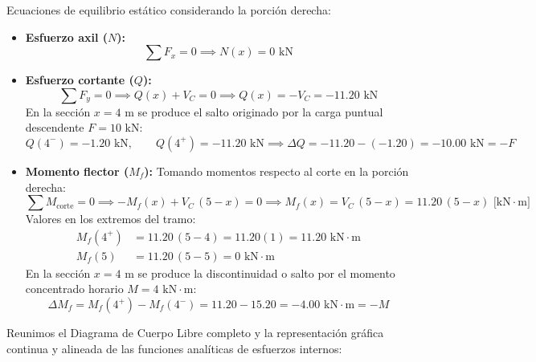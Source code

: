 Ecuaciones de equilibrio estático considerando la porción derecha:
\begin{itemize}
    \item \textbf{Esfuerzo axil ($N$):}
          \begin{equation}
              \sum F_x = 0 \implies \boxed{N(x) = 0\text{ kN}}
          \end{equation}

    \item \textbf{Esfuerzo cortante ($Q$):}
          \begin{equation}
              \sum F_y = 0 \implies Q(x) + V_C = 0 \implies \boxed{Q(x) = -V_C = -11.20\text{ kN}}
          \end{equation}
          En la sección $x = 4\text{ m}$ se produce el salto originado por la carga puntual descendente $F = 10\text{ kN}$:
          \begin{equation*}
              Q(4^-) = -1.20\text{ kN}, \qquad Q(4^+) = -11.20\text{ kN} \implies \Delta Q = -11.20 - (-1.20) = -10.00\text{ kN} = -F
          \end{equation*}

    \item \textbf{Momento flector ($M_f$):}
          Tomando momentos respecto al corte en la porción derecha:
          \begin{equation}
              \sum M_{\text{corte}} = 0 \implies -M_f(x) + V_C\,(5 - x) = 0 \implies \boxed{M_f(x) = V_C\,(5 - x) = 11.20\,(5 - x)\text{ [kN}\cdot\text{m]}}
          \end{equation}
          Valores en los extremos del tramo:
          \begin{align*}
              M_f(4^+) & = 11.20\,(5 - 4) = 11.20(1) = \boxed{11.20\text{ kN}\cdot\text{m}} \\
              M_f(5)   & = 11.20\,(5 - 5) = \boxed{0\text{ kN}\cdot\text{m}}
          \end{align*}
          En la sección $x = 4\text{ m}$ se produce la discontinuidad o salto por el momento concentrado horario $M = 4\text{ kN}\cdot\text{m}$:
          \begin{equation}
              \Delta M_f = M_f(4^+) - M_f(4^-) = 11.20 - 15.20 = -4.00\text{ kN}\cdot\text{m} = -M
          \end{equation}
\end{itemize}


Reunimos el Diagrama de Cuerpo Libre completo y la representación gráfica continua y alineada de las funciones analíticas de esfuerzos internos:

